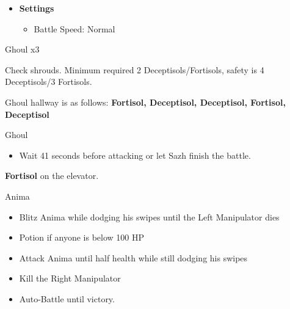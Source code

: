 	\begin{menu}
		\begin{itemize}
			\item \textbf{Settings}
			      \begin{itemize}
				      \item Battle Speed: Normal
			      \end{itemize}
		\end{itemize}
	\end{menu}

	\begin{battle}[0:12]{Ghoul x3}
	\end{battle}

	Check shrouds. Minimum required 2 Deceptisols/Fortisols, safety is 4 Deceptisols/3 Fortisols.

	Ghoul hallway is as follows: {\bf Fortisol, Deceptisol, Deceptisol, Fortisol, Deceptisol}

	\begin{battle}[0:41]{Ghoul}
		\begin{itemize}
			\item Wait 41 seconds before attacking or let Sazh finish the battle.
		\end{itemize}
	\end{battle}

	\textbf{Fortisol} on the elevator.

	\begin{battle}[0:54]{Anima}

		\begin{itemize}
			\item Blitz Anima while dodging his swipes until the Left Manipulator dies
			\item Potion if anyone is below 100 HP
			\item Attack Anima until half health while still dodging his swipes
			\item Kill the Right Manipulator
			\item Auto-Battle until victory.
		\end{itemize}
	\end{battle}


	\vfill
	\ 
	\columnbreak

